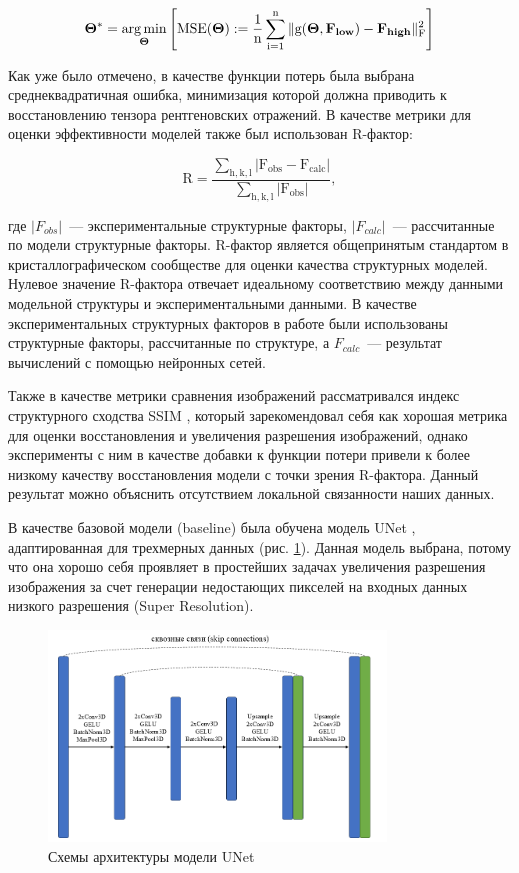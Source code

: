 \begin{equation}
\mathrm{\mathbf{\Theta^*} = \operatorname*{arg\,min}_{\mathbf{\Theta}} \left[ MSE(\mathbf{\Theta}) := \frac{1}{n}\sum\limits_{i=1}^n\|g(\mathbf{\Theta}, \mathbf{F_{low}}) - \mathbf{F_{high}}\|^2_F\right]}
\end{equation} 


Как уже было отмечено, в качестве функции потерь была выбрана среднеквадратичная ошибка, минимизация которой должна приводить к восстановлению тензора рентгеновских отражений. В качестве метрики для оценки эффективности моделей также был использован R-фактор:

\begin{equation}
\mathrm{R = \frac{\sum\limits_{h,k,l}|F_{obs}-F_{calc}|}{\sum\limits_{h,k,l}|F_{obs}|}},
\end{equation}

где $|F_{obs}|$~--- экспериментальные структурные факторы, $|F_{calc}|$~--- рассчитанные по модели структурные факторы. R-фактор является общепринятым стандартом в кристаллографическом сообществе для оценки качества структурных моделей. Нулевое значение R-фактора отвечает идеальному соответствию между данными модельной структуры и экспериментальными данными. В качестве экспериментальных структурных факторов в работе были использованы структурные факторы, рассчитанные по структуре, а $F_{calc}$~--- результат вычислений с помощью нейронных сетей.

Также в качестве метрики сравнения изображений рассматривался индекс структурного сходства SSIM \cite{zeng_3d-ssim_2012}, который зарекомендовал себя как хорошая метрика для оценки восстановления и увеличения разрешения изображений, однако эксперименты с ним в качестве добавки к функции потери привели к более низкому качеству восстановления модели с точки зрения R-фактора. Данный результат можно объяснить отсутствием локальной связанности наших данных.

В качестве базовой модели (baseline) была обучена модель UNet \cite{ronneberger_u-net_2015}, адаптированная для трехмерных данных (рис. \ref{unet}). Данная модель выбрана, потому что она хорошо себя проявляет в простейших задачах увеличения разрешения изображения за счет генерации недостающих пикселей на входных данных низкого разрешения (Super Resolution).

\begin{figure}[H]
    \centering
    \includegraphics[width=0.8\textwidth]{figures/unet_arch.png}
    \caption{Схемы архитектуры модели UNet}
    \label{unet}
\end{figure}

